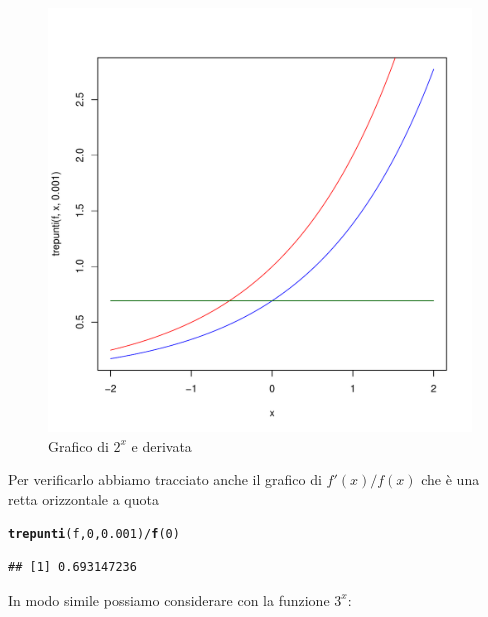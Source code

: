 \documentclass[onecolumn,11pt]{book}\usepackage[]{graphicx}\usepackage[]{color}
\makeatletter
\def\maxwidth{ %
  \ifdim\Gin@nat@width>\linewidth
    \linewidth
  \else
    \Gin@nat@width
  \fi
}
\newcommand{\hlnum}[1]{\textcolor[rgb]{0.686,0.059,0.569}{#1}}%
\newcommand{\hlopt}[1]{\textcolor[rgb]{0,0,0}{#1}}%
\newcommand{\hlstd}[1]{\textcolor[rgb]{0.345,0.345,0.345}{#1}}%
\newcommand{\hlkwd}[1]{\textcolor[rgb]{0.737,0.353,0.396}{\textbf{#1}}}%
\newenvironment{kframe}{%
 \def\at@end@of@kframe{}%
 \ifinner\ifhmode%
  \def\at@end@of@kframe{\end{minipage}}%
  \begin{minipage}{\columnwidth}%
 \fi\fi%
 \def\FrameCommand##1{\hskip\@totalleftmargin \hskip-\fboxsep
 \colorbox{shadecolor}{##1}\hskip-\fboxsep
     \hskip-\linewidth \hskip-\@totalleftmargin \hskip\columnwidth}%
 \MakeFramed {\advance\hsize-\width
   \@totalleftmargin\z@ \linewidth\hsize
   \@setminipage}}%
 {\par\unskip\endMakeFramed%
 \at@end@of@kframe}
\newenvironment{knitrout}{}{} %
\makeatother
\begin{document}
\begin{figure}[ htbp]
\begin{center}
\begin{knitrout}
\color{fgcolor}
\includegraphics[width=\maxwidth]{figure/unnamed-chunk-121-1} 

\end{knitrout}
\caption{Grafico di $2^x$ e derivata}
\label{fig:der2x}
\end{center}
\end{figure}
Per verificarlo abbiamo tracciato anche il grafico di $f'(x)/f(x)$ che \`e una retta orizzontale a quota
\begin{knitrout}
\color{fgcolor}\begin{kframe}
\begin{alltt}
 \hlkwd{trepunti}\hlstd{(f,}\hlnum{0}\hlstd{,}\hlnum{0.001}\hlstd{)}\hlopt{/}\hlkwd{f}\hlstd{(}\hlnum{0}\hlstd{)}
\end{alltt}
\begin{verbatim}
## [1] 0.693147236
\end{verbatim}
\end{kframe}
\end{knitrout}
In modo simile possiamo considerare con la funzione $3^x$:
\end{document}
